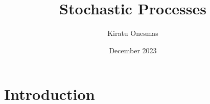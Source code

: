 \documentclass{article}
\title{Stochastic Processes}
\author{Kiratu Onesmas}
\date{December 2023}
\begin{document}
\maketitle

\section{Introduction}
\end{document}
